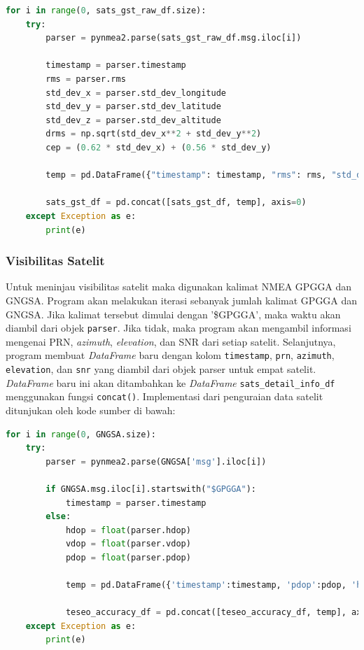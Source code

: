 \begin{lstlisting}[language=python]
for i in range(0, sats_gst_raw_df.size):
	try:
		parser = pynmea2.parse(sats_gst_raw_df.msg.iloc[i])
		
		timestamp = parser.timestamp
		rms = parser.rms
		std_dev_x = parser.std_dev_longitude
		std_dev_y = parser.std_dev_latitude
		std_dev_z = parser.std_dev_altitude
		drms = np.sqrt(std_dev_x**2 + std_dev_y**2)
		cep = (0.62 * std_dev_x) + (0.56 * std_dev_y)
		
		temp = pd.DataFrame({"timestamp": timestamp, "rms": rms, "std_dev_x": std_dev_x, "std_dev_y": std_dev_y, "std_dev_z": std_dev_z, "drms": drms, "cep": cep}, index=[i])
		
		sats_gst_df = pd.concat([sats_gst_df, temp], axis=0)
	except Exception as e:
		print(e)
\end{lstlisting}

\subsubsection{Visibilitas Satelit}
Untuk meninjau visibilitas satelit maka digunakan kalimat NMEA GPGGA dan GNGSA. Program akan melakukan iterasi sebanyak jumlah kalimat GPGGA dan GNGSA. Jika kalimat tersebut dimulai dengan '\$GPGGA', maka waktu akan diambil dari objek \texttt{parser}. Jika tidak, maka program akan mengambil informasi mengenai PRN, \textit{azimuth}, \textit{elevation}, dan SNR dari setiap satelit. Selanjutnya, program membuat \textit{DataFrame} baru dengan kolom \texttt{timestamp}, \texttt{prn}, \texttt{azimuth}, \texttt{elevation}, dan \texttt{snr} yang diambil dari objek parser untuk empat satelit. \textit{DataFrame} baru ini akan ditambahkan ke \textit{DataFrame} \texttt{sats\_detail\_info\_df} menggunakan fungsi \texttt{concat()}. Implementasi dari penguraian data satelit ditunjukan oleh kode sumber di bawah:

\begin{lstlisting}[language=python]
for i in range(0, GNGSA.size):
	try:
		parser = pynmea2.parse(GNGSA['msg'].iloc[i])
		
		if GNGSA.msg.iloc[i].startswith("$GPGGA"):
			timestamp = parser.timestamp
		else:
			hdop = float(parser.hdop)
			vdop = float(parser.vdop)
			pdop = float(parser.pdop)
			
			temp = pd.DataFrame({'timestamp':timestamp, 'pdop':pdop, 'hdop':hdop, 'vdop':vdop}, index=[i])
			
			teseo_accuracy_df = pd.concat([teseo_accuracy_df, temp], axis=0)
	except Exception as e:
		print(e)
\end{lstlisting}
	

